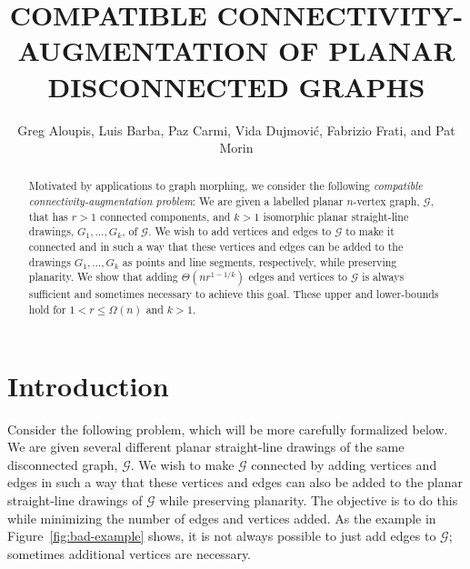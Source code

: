 \documentclass[11pt]{patmorin}
\title{\MakeUppercase{Compatible Connectivity-Augmentation of Planar Disconnected Graphs}}
\author{Greg Aloupis, Luis Barba, Paz Carmi, Vida Dujmović, Fabrizio Frati,
        and Pat Morin}
\begin{document}
\begin{titlepage}

\maketitle
\begin{abstract}
Motivated by applications to graph morphing, we consider the following \emph{compatible connectivity-augmentation
problem}: We are given a labelled planar $n$-vertex graph,
$\mathcal{G}$, that has $r>1$ connected components, and $k>1$ isomorphic planar straight-line drawings, $G_1,\ldots,G_k$, of
$\mathcal{G}$. We wish to add vertices and edges to $\mathcal{G}$ to make
it connected and in such a way that these vertices and edges can be added to
the drawings $G_1,\ldots,G_k$ as points and line segments, respectively, while preserving planarity.  We show that
adding $\Theta(nr^{1-1/k})$ edges and vertices to $\mathcal{G}$ is always
sufficient and sometimes necessary to achieve this goal. These upper and lower-bounds hold for $1 < r \le \Omega(n)$ and $k>1$. 
\end{abstract}

\end{titlepage}


\section{Introduction}


Consider the following problem, which will be more carefully formalized
below.  We are given several different planar straight-line drawings
of the same disconnected graph, $\mathcal G$.
We wish to make $\mathcal G$ connected by adding vertices and edges in
such a way that these vertices and edges can also be added to the planar
straight-line drawings of $\mathcal G$ while preserving planarity.  
The objective is to do this while minimizing the number
of edges and vertices added.  As the example in Figure~\ref{fig:bad-example} shows, it is not always possible to just add edges to $\mathcal G$; sometimes additional vertices are necessary.
\end{document}
